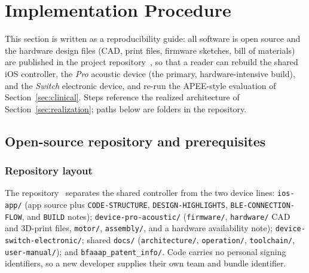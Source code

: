 
\section{Implementation Procedure}
\label{sec:impl}

This section is written as a reproducibility guide: all software is open source
and the hardware design files (CAD, print files, firmware sketches, bill of
materials) are published in the project repository~\cite{repo}, so that a reader
can rebuild the shared iOS controller, the \emph{Pro} acoustic device (the
primary, hardware-intensive build), and the \emph{Switch} electronic device, and
re-run the APEE-style evaluation of Section~\ref{sec:clinical}. Steps reference
the realized architecture of Section~\ref{sec:realization}; paths below are
folders in the repository.

\subsection{Open-source repository and prerequisites}
\label{sec:impl-repo}

\subsubsection{Repository layout}
\label{sec:impl-layout}
The repository~\cite{repo} separates the shared controller from the two device
lines: \texttt{ios-app/} (app source plus \texttt{CODE-STRUCTURE},
\texttt{DESIGN-HIGHLIGHTS}, \texttt{BLE-CONNECTION-FLOW}, and \texttt{BUILD}
notes); \texttt{device-pro-acoustic/} (\texttt{firmware/}, \texttt{hardware/}
CAD and 3D-print files, \texttt{motor/}, \texttt{assembly/}, and a hardware
availability note); \texttt{device-switch-electronic/}; shared \texttt{docs/}
(\texttt{architecture/}, \texttt{operation/}, \texttt{toolchain/},
\texttt{user-manual/}); and \texttt{bfaaap\_patent\_info/}. Code carries no
personal signing identifiers, so a new developer supplies their own team and
bundle identifier.

